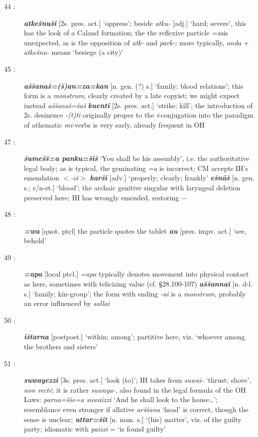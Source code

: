 \documentclass[10pt]{article}
\newcommand{\bit}[1]{\textbf{\textit{#1}}}				%
\newcommand{\p}[1]{{\tiny[{#1}]}}					%
\newcommand{\hith}{\textsubwedge{h}}
\renewcommand{\.}[1]{\textsubdot{#1}}
\begin{document}
\begin{description}
\item[44 :] \bit{{\hith}atke\v{s}nu\v{s}i} \p{2s. pres. act.} `oppress'; beside \textit{{\hith}atku-} \p{adj.} `hard; severe', this has the look of a Caland formation; the the reflexive particle \textit{=za}is unexpected, as is the opposition of \textit{{\hith}atk-} and \textit{park-}; more typically, \textit{anda} + \textit{{\hith}atke\v{s}nu-} means `besiege (a city)'

\item[45 :] \bit{{\hith}a\v{s}\v{s}ana\v{s}=(\v{s})an=za=kan} \p{n. gen. (?) s.} `family; blood relations'; this form is a \textit{monstrum}, clearly created by a late copyist; we might expect instead \textit{{\hith}a\v{s}\v{s}ana\v{s}=\v{s}a\v{s}} \bit{kuenti} \p{2s. pres. act.} `strike; kill'; the introduction of 2s. desinence \textit{-(t)ti} originally proper to the \textit{{\hith}i}-conjugation into the paradigm of athematic \textit{mi-}verbs is very early, already frequent in OH

\item[47 :] \bit{\v{s}ume\v{s}\v{s}=a panku=\v{s}i\v{s}} `You shall be his assembly', i.e. the authoritative legal body; as is typical, the geminating \textit{=a} is incorrect; CM accepts IH's emendation $<$\textit{-i\v{s}}$>$ \bit{kar\v{s}i} \p{adv.} `properly; clearly; frankly' \bit{e\v{s}n\=a\v{s}} \p{n. gen. s.; r/n-st.} `blood'; the archaic genitive singular with laryngeal deletion preserved here; IH has wrongly emended, restoring \textit{-{\hith}-}

\item[48 :] \bit{=wa} \p{quot. ptcl} the particle quotes the tablet \bit{au} \p{pres. impv. act.} `see, behold'

\item[49 :] \bit{=apa} \p{local ptcl.} \textit{=apa} typically denotes movement into physical contact as here, sometimes with telicizing value (cf.  \S28.100-107) \bit{{\hith}a\v{s}\v{s}annai} \p{n. d-l. s.} `family; kin-group'; the form with ending \textit{-ai} is a \textit{monstrum}, probably an error influenced by \textit{sallai}

\item[50 :] \bit{i\v{s}tarna} \p{postpost.} `within; among'; partitive here, viz. `whoever among the brothers and sisters'

\item[51 :] \bit{suwayezzi} \p{3s. pres. act.} `look (to)'; IH takes from \textit{suwai-} `thrust; shove', \textit{non rect\=e}; it is rather \textit{suwaya-}, also found in the legal formula of the OH Laws: \textit{parna=\v{s}\v{s}e=a suwaizzi} `And he shall look to the house\ldots'; resemblance even stronger if allative \textit{{\hith}ar\v{s}\v{s}ana} `head' is correct, though the sense is unclear; \bit{uttar=\v{s}it} \p{n. nom. s.} `(his) matter', viz. of the guilty party; idiomatic with \textit{paizzi} = `is found guilty'


\end{description}
\end{document}
